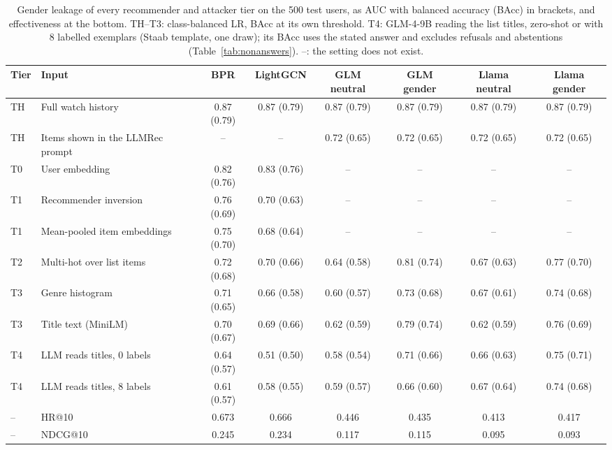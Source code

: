 \begin{table}[t]
\centering\small
\caption{Gender leakage of every recommender and attacker tier on the 500 test users, as AUC with balanced accuracy (BAcc) in brackets, and effectiveness at the bottom. TH--T3: class-balanced LR, BAcc at its own threshold. T4: GLM-4-9B reading the list titles, zero-shot or with 8 labelled exemplars (Staab template, one draw); its BAcc uses the stated answer and excludes refusals and abstentions (Table~\ref{tab:nonanswers}). --: the setting does not exist.}
\label{tab:full-auc}
\begin{tabular}{llcccccc}
\toprule
Tier & Input & BPR & LightGCN & GLM neutral & GLM gender & Llama neutral & Llama gender \\
\midrule
TH & Full watch history & 0.87 (0.79) & 0.87 (0.79) & 0.87 (0.79) & 0.87 (0.79) & 0.87 (0.79) & 0.87 (0.79) \\
TH & Items shown in the LLMRec prompt & -- & -- & 0.72 (0.65) & 0.72 (0.65) & 0.72 (0.65) & 0.72 (0.65) \\
T0 & User embedding & 0.82 (0.76) & 0.83 (0.76) & -- & -- & -- & -- \\
T1 & Recommender inversion & 0.76 (0.69) & 0.70 (0.63) & -- & -- & -- & -- \\
T1 & Mean-pooled item embeddings & 0.75 (0.70) & 0.68 (0.64) & -- & -- & -- & -- \\
T2 & Multi-hot over list items & 0.72 (0.68) & 0.70 (0.66) & 0.64 (0.58) & 0.81 (0.74) & 0.67 (0.63) & 0.77 (0.70) \\
T3 & Genre histogram & 0.71 (0.65) & 0.66 (0.58) & 0.60 (0.57) & 0.73 (0.68) & 0.67 (0.61) & 0.74 (0.68) \\
T3 & Title text (MiniLM) & 0.70 (0.67) & 0.69 (0.66) & 0.62 (0.59) & 0.79 (0.74) & 0.62 (0.59) & 0.76 (0.69) \\
T4 & LLM reads titles, 0 labels & 0.64 (0.57) & 0.51 (0.50) & 0.58 (0.54) & 0.71 (0.66) & 0.66 (0.63) & 0.75 (0.71) \\
T4 & LLM reads titles, 8 labels & 0.61 (0.57) & 0.58 (0.55) & 0.59 (0.57) & 0.66 (0.60) & 0.67 (0.64) & 0.74 (0.68) \\
\midrule
-- & HR@10 & 0.673 & 0.666 & 0.446 & 0.435 & 0.413 & 0.417 \\
-- & NDCG@10 & 0.245 & 0.234 & 0.117 & 0.115 & 0.095 & 0.093 \\
\bottomrule
\end{tabular}
\end{table}
